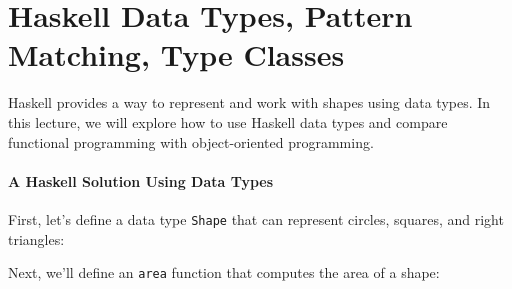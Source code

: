 \hypertarget{haskell-data-types-pattern-matching-type-classes}{%
\section{Haskell Data Types, Pattern Matching, Type
Classes}\label{haskell-data-types-pattern-matching-type-classes}}

Haskell provides a way to represent and work with shapes using data
types. In this lecture, we will explore how to use Haskell data types
and compare functional programming with object-oriented programming.

\hypertarget{a-haskell-solution-using-data-types}{%
\paragraph{A Haskell Solution Using Data
Types}\label{a-haskell-solution-using-data-types}}

First, let's define a data type \texttt{Shape} that can represent
circles, squares, and right triangles:

\begin{Shaded}
\begin{Highlighting}[]
  
  \OtherTok{=}            
  \OperatorTok{|}            
  \OperatorTok{|}      
   
\end{Highlighting}
\end{Shaded}

Next, we'll define an \texttt{area} function that computes the area of a
shape:

\begin{Shaded}
\begin{Highlighting}[]
  \OtherTok{{-}\textgreater{}} 
\OtherTok{=} 
    \OtherTok{{-}\textgreater{}}  \OperatorTok{*}\OperatorTok{*}
    \OtherTok{{-}\textgreater{}}\OperatorTok{*}
    \OtherTok{{-}\textgreater{}}\OperatorTok{*}
\end{Highlighting}
\end{Shaded}

